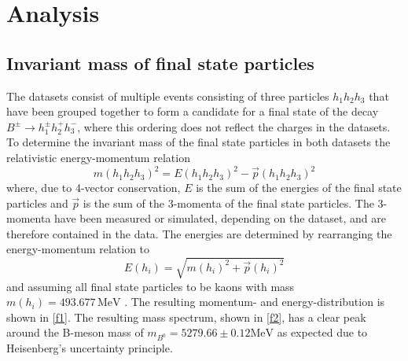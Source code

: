 \section{Analysis}\label{sec:analysis}

\subsection{Invariant mass of final state particles}
The datasets consist of multiple events consisting of three particles $h_1 h_2 h_3$ that have been grouped together to form a candidate for a final state
of the decay $B^\pm \rightarrow h_1^\pm h_2^+ h_3^-$, where this ordering does not reflect the charges in the datasets.
To determine the invariant mass of the final state particles in both datasets the relativistic energy-momentum relation
\begin{equation}
  m(h_1 h_2 h_3)^2 = E(h_1 h_2 h_3)^2 - \vec{p}(h_1 h_2 h_3)^2
\end{equation}
where, due to 4-vector conservation, $E$ is the sum of the energies of the final state particles and $\vec{p}$ is the sum of the 3-momenta of the
final state particles. The 3-momenta have been measured or simulated, depending on the dataset, and are therefore contained in the data.
The energies are determined by rearranging the energy-momentum relation to
\begin{equation}
  E(h_i) = \sqrt{m(h_i)^2 + \vec{p}(h_i)^2}
\end{equation}
and assuming all final state particles to be kaons with mass $m(h_i) = 493.677 \, \si{\mega\eV}$ \cite{pdg}. The resulting momentum- and energy-distribution
is shown in \autoref{f1}. The resulting mass spectrum, shown in \autoref{f2}, has a clear peak around the B-meson mass of
$m_{B^0} = 5279.66 \pm 0.12 \si{\mega\eV}$ \cite{pdg} as expected due to Heisenberg's uncertainty principle.



